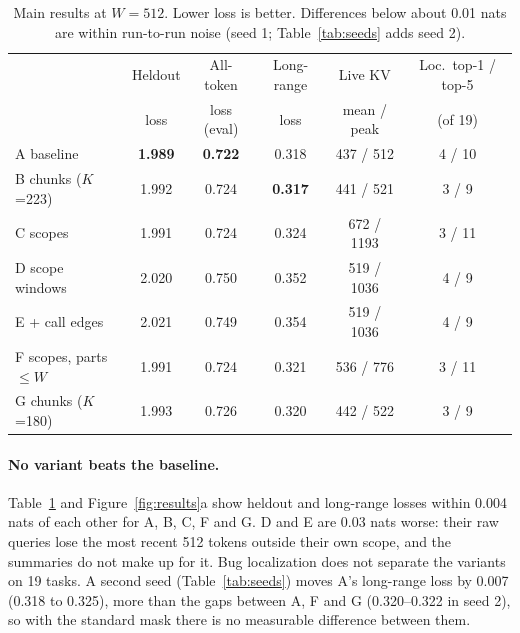 \documentclass[11pt]{article}
\begin{document}
\begin{table}[t]
\centering\small
\begin{tabular}{@{}lccccc@{}}
\toprule
& Heldout & All-token & Long-range & Live KV & Loc.\ top-1 / top-5 \\
& loss & loss (eval) & loss & mean / peak & (of 19) \\
\midrule
A baseline & \textbf{1.989} & \textbf{0.722} & 0.318 & 437 / 512 & 4 / 10 \\
B chunks ($K$=223) & 1.992 & 0.724 & \textbf{0.317} & 441 / 521 & 3 / 9 \\
C scopes & 1.991 & 0.724 & 0.324 & 672 / 1193 & 3 / 11 \\
D scope windows & 2.020 & 0.750 & 0.352 & 519 / 1036 & 4 / 9 \\
E + call edges & 2.021 & 0.749 & 0.354 & 519 / 1036 & 4 / 9 \\
F scopes, parts $\le W$ & 1.991 & 0.724 & 0.321 & 536 / 776 & 3 / 11 \\
G chunks ($K$=180) & 1.993 & 0.726 & 0.320 & 442 / 522 & 3 / 9 \\
\bottomrule
\end{tabular}
\caption{Main results at $W=512$. Lower loss is better. Differences below
about 0.01 nats are within run-to-run noise (seed 1; Table~\ref{tab:seeds} adds
seed 2).}
\label{tab:main}
\end{table}

\paragraph{No variant beats the baseline.}
Table~\ref{tab:main} and Figure~\ref{fig:results}a show heldout and long-range losses within 0.004 nats of
each other for A, B, C, F and G. D and E are 0.03 nats worse: their raw
queries lose the most recent 512 tokens outside their own scope, and the
summaries do not make up for it. Bug localization does not separate the
variants on 19 tasks. A second seed (Table~\ref{tab:seeds}) moves A's
long-range loss by 0.007 (0.318 to 0.325), more than the gaps between A, F
and G (0.320--0.322 in seed 2), so with the standard mask there is no
measurable difference between them.
\end{document}
